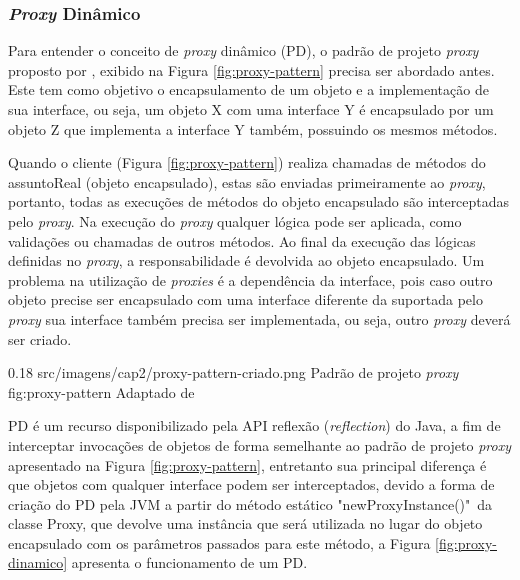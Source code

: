 \subsubsection{\textit{Proxy} Dinâmico}

\par Para entender o conceito de \textit{proxy} dinâmico (PD), o padrão de projeto \textit{proxy} proposto por , exibido na Figura \ref{fig:proxy-pattern} precisa ser abordado antes. Este tem como objetivo o encapsulamento de um objeto e a implementação de sua interface, ou seja, um objeto X com uma interface Y é encapsulado por um objeto Z que implementa a interface Y também, possuindo os mesmos métodos.

\par Quando o cliente (Figura \ref{fig:proxy-pattern}) realiza chamadas de métodos do assuntoReal (objeto encapsulado), estas são enviadas primeiramente ao \textit{proxy}, 
portanto, todas as execuções de métodos do objeto encapsulado são interceptadas pelo \textit{proxy}. Na execução do \textit{proxy} qualquer lógica pode ser aplicada, como validações ou chamadas de outros métodos. Ao final da execução das lógicas definidas no \textit{proxy}, a responsabilidade é devolvida ao objeto encapsulado. Um problema na utilização de \textit{proxies} é a dependência da interface, pois caso outro objeto precise ser encapsulado com uma interface diferente da suportada pelo \textit{proxy} sua interface também precisa ser implementada, ou seja, outro \textit{proxy} deverá ser criado.

\begin{image}
{0.18} %
{src/imagens/cap2/proxy-pattern-criado.png} %
{Padrão de projeto \textit{proxy}} %
{fig:proxy-pattern} %
{Adaptado de } %
\end{image}


\par PD é um recurso disponibilizado pela API reflexão (\textit{reflection}) do Java, a fim de interceptar invocações de objetos de forma semelhante ao padrão de projeto \textit{proxy} apresentado na Figura \ref{fig:proxy-pattern}, entretanto sua principal diferença é que objetos com qualquer interface podem ser interceptados, devido a forma de criação do PD pela JVM a partir do método estático "newProxyInstance()"\ da classe Proxy, que devolve uma instância que será utilizada no lugar do objeto encapsulado com os parâmetros passados para este método, a Figura \ref{fig:proxy-dinamico} apresenta o funcionamento de um PD.

